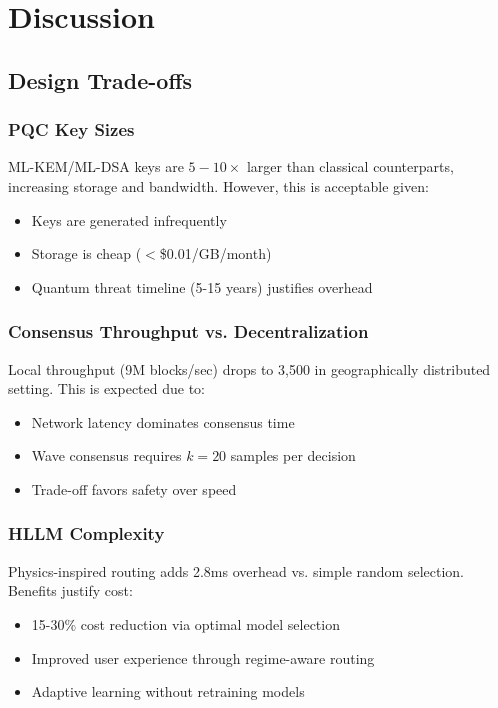 \documentclass[11pt,twocolumn]{article}
\begin{document}
\section{Discussion}

\subsection{Design Trade-offs}

\subsubsection{PQC Key Sizes}

ML-KEM/ML-DSA keys are $5-10\times$ larger than classical counterparts, increasing storage and bandwidth. However, this is acceptable given:
\begin{itemize}
\item Keys are generated infrequently
\item Storage is cheap ($<$\$0.01/GB/month)
\item Quantum threat timeline (5-15 years) justifies overhead
\end{itemize}

\subsubsection{Consensus Throughput vs. Decentralization}

Local throughput (9M blocks/sec) drops to 3,500 in geographically distributed setting. This is expected due to:
\begin{itemize}
\item Network latency dominates consensus time
\item Wave consensus requires $k=20$ samples per decision
\item Trade-off favors safety over speed
\end{itemize}

\subsubsection{HLLM Complexity}

Physics-inspired routing adds 2.8ms overhead vs. simple random selection. Benefits justify cost:
\begin{itemize}
\item 15-30\% cost reduction via optimal model selection
\item Improved user experience through regime-aware routing
\item Adaptive learning without retraining models
\end{itemize}
\end{document}
